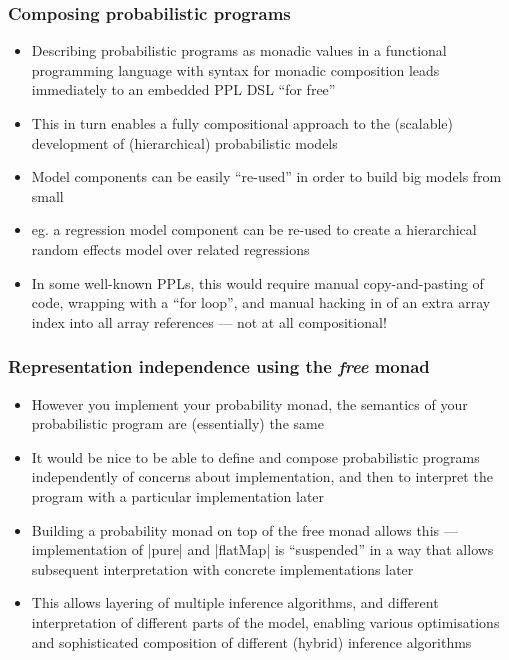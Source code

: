 \documentclass[mathserif,handout]{beamer}
\begin{document}
\begin{frame}
  \frametitle{Composing probabilistic programs}
  \begin{itemize}
  \item Describing probabilistic programs as \alert{monadic values} in a functional programming language with syntax for monadic composition leads immediately to an \alert{embedded PPL DSL} ``for free''
  \item This in turn enables a fully \alert{compositional} approach to the (scalable) development of (hierarchical) probabilistic models
  \item Model components can be easily ``re-used'' in order to build big models from small
  \item eg. a regression model component can be re-used to create a hierarchical random effects model over related regressions
    \item In some well-known PPLs, this would require manual copy-and-pasting of code, wrapping with a ``for loop'', and manual hacking in of an extra array index into all array references --- not at all compositional!
  \end{itemize}
\end{frame}


\begin{frame}[fragile]
  \frametitle{Representation independence using the \emph{free} monad}
  \begin{itemize}
  \item However you implement your probability monad, the semantics of your probabilistic program are (essentially) the same
  \item It would be nice to be able to define and compose probabilistic programs independently of concerns about implementation, and then to \alert{interpret} the program with a particular implementation later
  \item Building a probability monad on top of the \alert{free monad} allows this --- implementation of |pure| and |flatMap| is ``suspended'' in a way that allows subsequent interpretation with concrete implementations later
    \item This allows \alert{layering} of multiple inference algorithms, and different interpretation of different parts of the model, enabling various optimisations and sophisticated \alert{composition} of different (hybrid) inference algorithms
    \end{itemize}
\end{frame}
\end{document}
